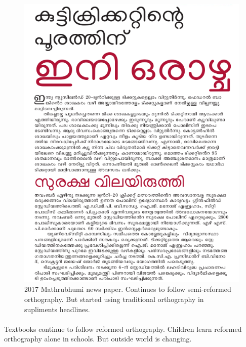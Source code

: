 \documentclass[10pt]{article}
\begin{document}
\begin{figure}[H]
	\centering
	\includegraphics[scale=0.5]{images/2017-Mathrubhumi-newspaper.png}
	\caption{2017 Mathrubhumi news paper. Continues to follow semi-reformed orthography. But started using traditional orthography in supliments headlines.}
\end{figure}

\paragraph{}
Textbooks continue to follow reformed orthography. Children learn reformed orthography alone in schools. But outside world is changing. 
\end{document}
